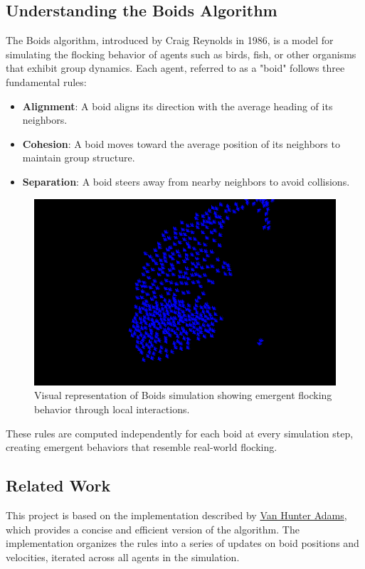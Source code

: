 \documentclass[10pt,twocolumn,letterpaper]{article}
\begin{document}
\subsection{Understanding the Boids Algorithm}
The Boids algorithm, introduced by Craig Reynolds in 1986, is a model for simulating the flocking behavior of agents such as birds, fish, or other organisms that exhibit group dynamics. Each agent, referred to as a "boid" follows three fundamental rules:

\begin{itemize}
    \item \textbf{Alignment}: A boid aligns its direction with the average heading of its neighbors.  
    \item \textbf{Cohesion}: A boid moves toward the average position of its neighbors to maintain group structure.  
    \item \textbf{Separation}: A boid steers away from nearby neighbors to avoid collisions.  
\end{itemize}

\begin{figure}[H]
\centering
\includegraphics[width=0.8\columnwidth]{../../images/boidsvisualizzationexample.png}
\caption{Visual representation of Boids simulation showing emergent flocking behavior through local interactions.}
\label{fig:boids_visualization}
\end{figure}

These rules are computed independently for each boid at every simulation step, creating emergent behaviors that resemble real-world flocking.  

\subsection{Related Work}
This project is based on the implementation described by \href{https://vanhunteradams.com/Pico/Animal_Movement/Boids-algorithm.html}{Van Hunter Adams}, which provides a concise and efficient version of the algorithm. The implementation organizes the rules into a series of updates on boid positions and velocities, iterated across all agents in the simulation.
\end{document}
